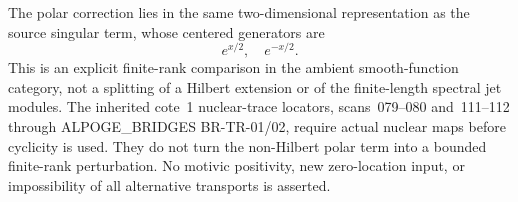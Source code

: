 The polar correction lies in the same two-dimensional
representation as the source singular term, whose centered
generators are
\[
                            e^{x/2},\quad e^{-x/2}.
 \tag{MA-MO.68}
\]
This is an explicit finite-rank comparison in the ambient
smooth-function category, not a splitting of a Hilbert
extension or of the finite-length spectral jet modules.
The inherited cote~1 nuclear-trace locators, scans~079--080
and~111--112 through ALPOGE\_BRIDGES BR-TR-01/02, require
actual nuclear maps before cyclicity is used. They do not
turn the non-Hilbert polar term into a bounded finite-rank
perturbation. No motivic positivity, new zero-location input,
or impossibility of all alternative transports is asserted.
